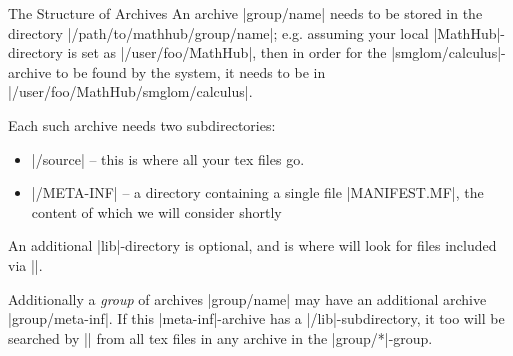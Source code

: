\begin{omgroup}{The Structure of \sTeX Archives}
    An \sTeX archive |group/name| needs to be stored in the
    directory |/path/to/mathhub/group/name|; e.g. assuming your
    local |MathHub|-directory is set as |/user/foo/MathHub|, then
    in order for the |smglom/calculus|-archive to be found by the
    \sTeX system, it needs to be in |/user/foo/MathHub/smglom/calculus|.

    Each such archive needs two subdirectories:
    \begin{itemize}
        \item |/source| -- this is where all your tex files go.
        \item |/META-INF| -- a directory containing a single file
            |MANIFEST.MF|, the content of which we will consider shortly
    \end{itemize}
    An additional |lib|-directory is optional, and is where \sTeX will
    look for files included via |\libinput|.

    Additionally a \emph{group} of archives |group/name| may have
    an additional archive |group/meta-inf|. If this |meta-inf|-archive
    has a |/lib|-subdirectory, it too will be searched by |\libinput|
    from all tex files in any archive in the |group/*|-group.
\end{omgroup}

